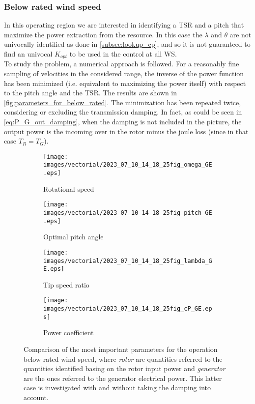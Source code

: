\subsubsection{Below rated wind speed}
In this operating region we are interested in identifying a \acrlong{TSR} and a pitch that maximize the power extraction from the resource. In this case the $\lambda$ and $\theta$ are not univocally identified as done in \autoref{subsec:lookup_cp}, and so it is not guaranteed to find an univocal $K_{opt}$ to be used in the control at all \acrshort{WS}.\\

To study the problem, a numerical approach is followed. For a reasonably fine sampling of velocities in the considered range, the inverse of the power function has been minimized (i.e. equivalent to maximizing the power itself) with respect to the pitch angle and the TSR. The results are shown in \autoref{fig:parameters_for_below_rated}. The minimization has been repeated twice, considering or excluding the transmission damping. In fact, as could be seen in \autoref{eq:P_G_out_damping}, when the damping is not included in the picture, the output power is the incoming over in the rotor minus the joule loss (since in that case $T_R=T_G$).
\begin{figure}[htb]
  \begin{subfigure}{0.5\textwidth}
    \centering
    \texttt{[image: images/vectorial/2023\_07\_10\_14\_18\_25fig\_omega\_GE.eps]}
    \caption{Rotational speed}
    \label{fig:2023_07_10_14_18_25fig_omega_GE}
  \end{subfigure}
  \begin{subfigure}{0.5\textwidth}
    \centering
    \texttt{[image: images/vectorial/2023\_07\_10\_14\_18\_25fig\_pitch\_GE.eps]}
    \caption{Optimal pitch angle}
    \label{fig:2023_06_24_15_57_04fig_pitch_GE}
  \end{subfigure}
  \begin{subfigure}{0.5\textwidth}
    \centering
    \texttt{[image: images/vectorial/2023\_07\_10\_14\_18\_25fig\_lambda\_GE.eps]}
    \caption{Tip speed ratio}
    \label{fig:2023_06_24_15_57_04fig_lambda_GE}
  \end{subfigure}
  \begin{subfigure}{0.5\textwidth}
    \centering
    \texttt{[image: images/vectorial/2023\_07\_10\_14\_18\_25fig\_cP\_GE.eps]}
    \caption{Power coefficient}
    \label{fig:2023_06_24_15_57_04fig_cP_GE}
  \end{subfigure}
  \caption{Comparison of the most important parameters for the operation below rated wind speed, where \textit{rotor} are quantities referred to the quantities identified basing on the rotor input power and \textit{generator} are the ones referred to the generator electrical power. This latter case is investigated with and without taking the damping into account.}
  \label{fig:parameters_for_below_rated}
\end{figure}

